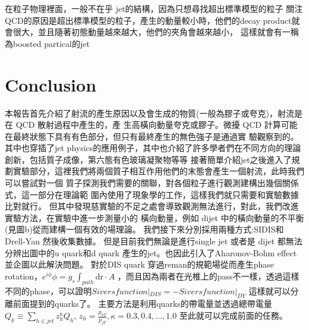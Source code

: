\documentclass[12pt, a4paper, oneside]{ctexart}
\begin{document}
\begin{spacing}{2.0}
在粒子物理裡面，一般不在乎 jet的結構，因為只想尋找超出標準模型的粒子
關注QCD的原因是超出標準模型的粒子，產生的動量較小時，他們的decay product就會很大，並且隨著初態動量越來越大，他們的夾角會越來越小，
這樣就會有一稱為boosted partical的jet


\section{Conclusion}
本報告首先介紹了射流的產生原因以及會生成的物質(一般為膠子或夸克)，射流是在 QCD 散射過程中產生的，產
生高橫向動量夸克或膠子。微擾 QCD 計算可能在最終狀態下具有有色部分，但只有最終產生的無色強子是通過實
驗觀察到的。
其中也穿插了jet physics的應用例子，其中也介紹了許多學者們在不同方向的理論創新，包括質子成像，第六態有色玻璃凝聚物等等
接著簡單介紹jet之後進入了規劃實驗部分，這裡我們將兩個質子相互作用他們的末態會產生一個射流，此時我們可以嘗試對一個
質子探測我們需要的關聯，對各個粒子進行觀測建構出幾個關係式，這一部分在理論範
圍內使用了現象學的工作，這樣我們就只需要和實驗數據比對就行。
但其中發現慈實驗的不足之處會導致觀測無法進行，對此，我們改進實驗方法，在實驗中進一步測量小的
橫向動量，例如 dijet 中的橫向動量的不平衡(見圖b)從而建構一個有效的場理論。
我們接下來分別採用兩種方式:SIDIS和Drell-Yan 然後收集數據。
但是目前我們無論是進行single jet 或者是 dijet 都無法分辨出圖中的u quark和d
quark 產生的jet。也因此引入了Aharonov-Bohm effect並企圖以此解決問題。
對於DIS quark 穿過reman的規範場從而產生phase rotation，$e^{i\phi}$$\phi = g_s \int_{path} \mathrm{d r}\cdot A$
，而且因為兩者在光椎上的pass不一樣，透過這樣不同的phase，可以證明$Sivers function|_{DIS} = -Sivers function|_{DY}$
這樣就可以分離前面提到的quarks了。
主要方法是利用quarks的帶電量並透過總帶電量$Q_k \equiv \sum_{h\in jet}z^{\kappa}_hQ_h$, $z_h = \frac{p_{hT}}{p_{jT}},\kappa = 0.3,0.4,\dots,1.0$
至此就可以完成前面的任務。



\end{spacing}



\end{document}
